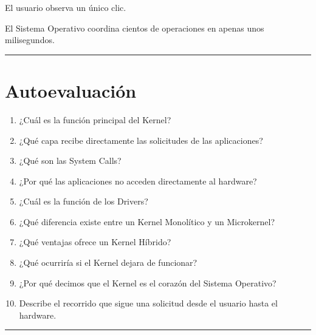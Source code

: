 \documentclass[
  spanish,
  letterpaper,
]{scrbook}
\providecommand{\tightlist}{%
  \setlength{\itemsep}{0pt}\setlength{\parskip}{0pt}}
\begin{document}
\begin{tcolorbox}[enhanced jigsaw, arc=.35mm, bottomrule=.15mm, bottomtitle=1mm, breakable, colback=white, colbacktitle=quarto-callout-tip-color!10!white, colframe=quarto-callout-tip-color-frame, coltitle=black, left=2mm, leftrule=.75mm, opacityback=0, opacitybacktitle=0.6, rightrule=.15mm, title=\textcolor{quarto-callout-tip-color}{\faLightbulb}\hspace{0.5em}{Idea clave}, titlerule=0mm, toprule=.15mm, toptitle=1mm]

El usuario observa un único clic.

El Sistema Operativo coordina cientos de operaciones en apenas unos
milisegundos.

\end{tcolorbox}

\begin{center}\rule{0.5\linewidth}{0.5pt}\end{center}


\chapter{Autoevaluación}\label{autoevaluaciuxf3n-4}

\begin{enumerate}
\def\labelenumi{\arabic{enumi}.}
\tightlist
\item
  ¿Cuál es la función principal del Kernel?
\item
  ¿Qué capa recibe directamente las solicitudes de las aplicaciones?
\item
  ¿Qué son las System Calls?
\item
  ¿Por qué las aplicaciones no acceden directamente al hardware?
\item
  ¿Cuál es la función de los Drivers?
\item
  ¿Qué diferencia existe entre un Kernel Monolítico y un Microkernel?
\item
  ¿Qué ventajas ofrece un Kernel Híbrido?
\item
  ¿Qué ocurriría si el Kernel dejara de funcionar?
\item
  ¿Por qué decimos que el Kernel es el corazón del Sistema Operativo?
\item
  Describe el recorrido que sigue una solicitud desde el usuario hasta
  el hardware.
\end{enumerate}

\begin{center}\rule{0.5\linewidth}{0.5pt}\end{center}
\end{document}
